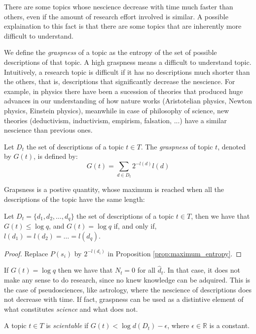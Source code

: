 There are some topics whose nescience decrease with time much faster than others, even if the amount of research effort involved is similar. A possible explaination to this fact is that there are some topics that are inherently more difficult to understand.

We define the \emph{graspness} of a topic as the entropy of the set of possible descriptions of that topic. A high graspness means a difficult to understand topic. Intuitively, a research topic is difficult if it has no descriptions much shorter than the others, that is, descriptions that significantly decrease the nescience. For example, in physics there have been a sucession of theories that produced huge advances in our understanding of how nature works (Aristotelian physics, Newton physics, Einstein physics), meanwhile in case of philosophy of science, new theories (deductivism, inductivism, empirism, falsation, ...) have a similar nescience than previous ones.

\begin{definition}[Graspness]
Let $D_t$ the set of descriptions of a topic $t \in T$. The \emph{graspness} of topic $t$, denoted by $G(t)$, is defined by:
\[
G(t) = \sum_{d \in D_t} 2^{-l(d)} l(d)
\]
\end{definition}

Grapsness is a postive quantity, whose maximum is reached when all the descriptions of the topic have the same length:

\begin{proposition}
Let $D_t = \{ d_1, d_2, \ldots, d_q \}$ the set of descriptions of a topic $t \in T$, then we have that $G(t) \leq \log q$, and $G(t) = \log q$ if, and only if, $l(d_1) = l(d_2) = \ldots = l(d_q)$.
\end{proposition}
\begin{proof}
Replace $P(s_i)$ by $2^{-l(d_i)}$ in Proposition \ref{prop:maximum_entropy}.
\end{proof}

If $G(t) = \log q$ then we have that $N_t = 0$ for all $\hat{d}_t$. In that case, it does not make any sense to do research, since no knew knowledge can be adquired. This is the case of pseudosciences, like astrology, where the nescience of descriptions does not decrease with time. If fact, graspness can be used as a distintive element of what constitutes \emph{science} and what does not.

\begin{definition}
A topic $t \in T$ is \emph{scientable} if $G(t) < \log d(D_t) - \epsilon$, where $\epsilon \in \mathbb{R}$ is a constant.
\end{definition}

